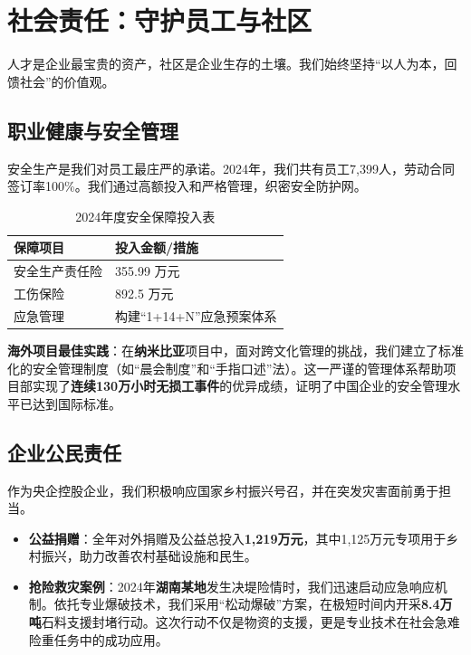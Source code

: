 \documentclass[a4paper,12pt]{article}
\begin{document}
\section{社会责任：守护员工与社区}

人才是企业最宝贵的资产，社区是企业生存的土壤。我们始终坚持“以人为本，回馈社会”的价值观。

\subsection{职业健康与安全管理}

安全生产是我们对员工最庄严的承诺。2024年，我们共有员工7,399人，劳动合同签订率100\%。我们通过高额投入和严格管理，织密安全防护网。

\begin{table}[H]
\centering
\caption{2024年度安全保障投入表}
\begin{tabular}{@{}ll@{}}
\toprule
\textbf{保障项目} & \textbf{投入金额/措施} \\ \midrule
安全生产责任险 & 355.99 万元 \\
工伤保险 & 892.5 万元 \\
应急管理 & 构建“1+14+N”应急预案体系 \\ \bottomrule
\end{tabular}
\end{table}

\textbf{海外项目最佳实践}：在\textbf{纳米比亚}项目中，面对跨文化管理的挑战，我们建立了标准化的安全管理制度（如“晨会制度”和“手指口述”法）。这一严谨的管理体系帮助项目部实现了\textbf{连续130万小时无损工事件}的优异成绩，证明了中国企业的安全管理水平已达到国际标准。

\subsection{企业公民责任}

作为央企控股企业，我们积极响应国家乡村振兴号召，并在突发灾害面前勇于担当。

\begin{itemize}
    \item \textbf{公益捐赠}：全年对外捐赠及公益总投入\textbf{1,219万元}，其中1,125万元专项用于乡村振兴，助力改善农村基础设施和民生。
    \item \textbf{抢险救灾案例}：2024年\textbf{湖南某地}发生决堤险情时，我们迅速启动应急响应机制。依托专业爆破技术，我们采用“松动爆破”方案，在极短时间内开采\textbf{8.4万吨}石料支援封堵行动。这次行动不仅是物资的支援，更是专业技术在社会急难险重任务中的成功应用。
\end{itemize}
\end{document}
